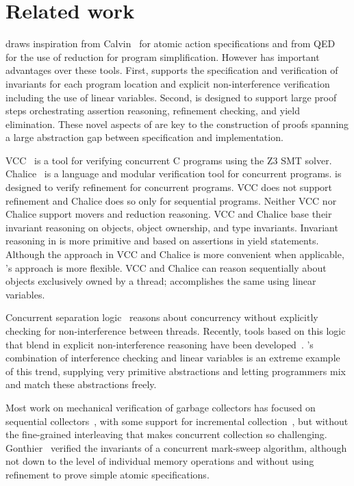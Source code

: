 \section{Related work}
\label{sec:related}

\civl draws inspiration from Calvin~\cite{FlanaganFQS05} for atomic action specifications
and from QED~\cite{ElmasQT09} for the use of reduction for program simplification.
However \civl has important advantages over these tools.
First, \civl supports the specification and verification of invariants for each program location 
and explicit non-interference verification including the use of linear variables. 
Second, \civl is designed to support large proof steps orchestrating assertion reasoning, 
refinement checking, and yield elimination.
These novel aspects of \civl are key to the construction of proofs spanning a large abstraction gap
between specification and implementation.

VCC~\cite{VCC} is a tool for verifying concurrent C programs using the Z3 SMT solver.  
Chalice~\cite{LM09} is a language and modular verification tool for concurrent programs. 
\civl is designed to verify refinement for concurrent programs.  
VCC does not support refinement and Chalice does so only for sequential programs. 
Neither VCC nor Chalice support movers and reduction reasoning.
VCC and Chalice base their invariant reasoning on objects, object ownership, and type invariants. 
Invariant reasoning in \civl is more primitive and based on assertions in yield statements. 
Although the approach in VCC and Chalice is more convenient when applicable, \civl's approach is more flexible. 
VCC and Chalice can reason sequentially about objects exclusively owned by a thread;
\civl accomplishes the same using linear variables.

Concurrent separation logic~\cite{OHearn07} reasons about concurrency without 
explicitly checking for non-interference between threads. 
Recently, tools based on this logic that blend in explicit non-interference reasoning have been developed~\cite{SAGL,RGSep}. 
\civl's combination of interference checking and linear variables is an extreme example of this trend,
supplying very primitive abstractions and letting programmers mix and match these abstractions freely.

Most work on mechanical verification of garbage collectors has focused on sequential collectors~\cite{mccr07,hawb09},
with some support for incremental collection~\cite{mccr07},
but without the fine-grained interleaving that makes concurrent collection so challenging.
Gonthier~\cite{gont96} verified the invariants of a concurrent mark-sweep algorithm,
although not down to the level of individual memory operations
and without using refinement to prove simple atomic specifications.


